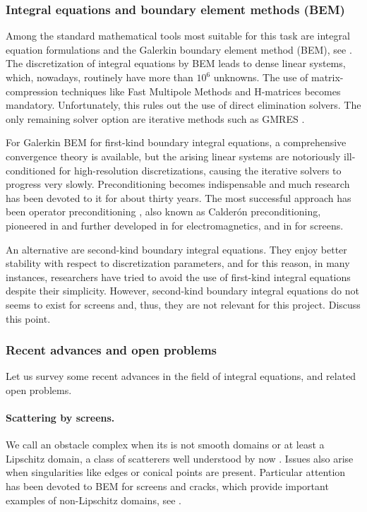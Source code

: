 \documentclass[]{report}
\newcommand{\ma}[1]{{\color{green}#1}}
\begin{document}
\subsubsection*{Integral equations and boundary element methods (BEM)}

Among the standard mathematical tools most suitable for this task are integral equation
formulations and the Galerkin boundary element method (BEM), see
\cite{mclean2000strongly,sauter2010boundary}. The discretization of integral equations by
BEM leads to dense linear systems, which, nowadays, routinely have more than $10^6$
unknowns. The use of matrix-compression techniques like Fast Multipole Methods
\cite{greengard1987fast} and H-matrices \cite{hackbusch1999sparse} becomes mandatory.
Unfortunately, this rules out the use of direct elimination solvers. The only remaining
solver option are iterative methods such as GMRES \cite{saad1986gmres}.

For Galerkin BEM for first-kind boundary integral equations, a comprehensive convergence
theory is available, but the arising linear systems are notoriously ill-conditioned for
high-resolution discretizations, causing the iterative solvers to progress very
slowly. Preconditioning becomes indispensable and much research has been devoted to it for
about thirty years. The most successful approach has been operator preconditioning
\cite{hiptmair2006operator2}, also known as Calder\'on preconditioning, pioneered in
\cite{steinbach1998construction} and further developed in \cite{buffa2007dual,andriulli2008multiplicative} for
electromagnetics, and in \cite{hiptmair2020optimal} for screens. 

An alternative are second-kind boundary integral equations. They enjoy better stability with
respect to discretization parameters, and for this reason, in many instances, researchers
have tried to avoid the use of first-kind integral equations despite their
simplicity. However, second-kind boundary integral equations do not seems to exist for
screens and, thus, they are not relevant for this project. \ma{Discuss this point.}

\subsubsection*{Recent advances and open problems}

Let us survey some recent advances in the field of integral equations, and related open problems.

\paragraph{Scattering by screens.} We call an obstacle complex when its is not smooth
domains or at least a Lipschitz domain, a class of scatterers well understood by now
\cite{mclean2000strongly}. Issues also arise when singularities like edges or conical
points are present. Particular attention has been devoted to BEM for screens and cracks,
which provide important examples of non-Lipschitz domains, see
\cite{bruno2013high,gimperlein2019optimal,hiptmair2018closed,hiptmair2019preconditioning,hiptmair2020optimal,hiptmair2020compact,ramaciotti2017some}.
\end{document}
